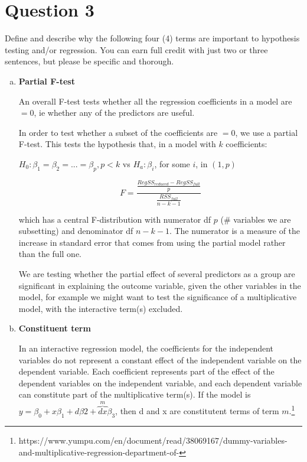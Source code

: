 \documentclass[12pt,letterpaper]{article}
\begin{document}
\newpage

\section*{Question 3}
\noindent  Define and describe why the following four (4) terms are important to hypothesis testing
and/or regression. You can earn full credit with just two or three sentences, but please be
specific and thorough.
  \begin{enumerate}[(a)]
    \item \textbf{Partial F-test}
    
    An overall F-test tests whether all the regression coefficients in a model are $= 0$, ie whether any of the predictors are useful.  
    
    In order to test whether a subset of the coefficients are $= 0$, we use a partial F-test.  This tests the hypothesis that, in a model with $k$ coefficients:
    
    \(H_0 : \beta_1 = \beta_2 = ... = \beta_{p}, p < k\)
    vs \(H_a : \beta_i\), for some $i$, in $(1,p)$
    
    \[ F = \frac{\frac{RegSS_{reduced} - RegSS_{full}}{p}}{\frac{RSS_{full}}{n-k-1}} \]

which has a central F-distribution with numerator df $p$ (\# variables we are subsetting) and denominator df $n-k-1$.  The numerator is a measure of the increase in standard error that comes from using the partial model rather than the full one.

    We are testing whether the partial effect of several predictors as a group are significant in explaining the outcome variable, given the other variables in the model, for example we might want to test the significance of a multiplicative model, with the interactive term(s) excluded.

    \item \textbf{Constituent term}
    
    In an interactive regression model, the coefficients for the independent variables do not represent a constant effect of the independent variable on the dependent variable.  Each coefficient represents part of the effect of the dependent variables on the independent variable, and each dependent variable can constitute part of the multiplicative term(s).  If the model is 
    $y = \beta_0 + x\beta_1 + d\beta2+ \overbrace{dx}^m\beta_3$,
    then d and x are constitutent terms of term $m$.\footnote{https://www.yumpu.com/en/document/read/38069167/dummy-variables-and-multiplicative-regression-department-of-}
    

\end{enumerate}
\end{document}
